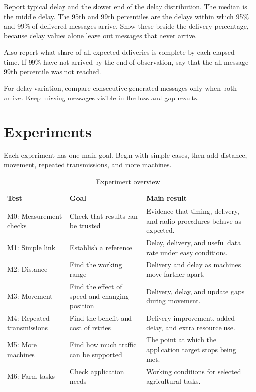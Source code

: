 \documentclass[11pt,a4paper]{article}
\begin{document}
Report typical delay and the slower end of the delay distribution. The median
is the middle delay. The 95th and 99th percentiles are the delays within which
95\% and 99\% of delivered messages arrive. Show these beside the delivery
percentage, because delay values alone leave out messages that never arrive.

Also report what share of all expected deliveries is complete by each elapsed
time. If 99\% have not arrived by the end of observation, say that the
all-message 99th percentile was not reached.

For delay variation, compare consecutive generated messages only when both
arrive. Keep missing messages visible in the loss and gap results.

\section{Experiments}
\label{sec:experiments}

Each experiment has one main goal. Begin with simple cases, then add distance,
movement, repeated transmissions, and more machines.

\begin{table}[htbp]
\centering
\caption{Experiment overview}
\small
\begin{tabularx}{\textwidth}{lYY}
\toprule
\textbf{Test} & \textbf{Goal} & \textbf{Main result} \\
\midrule
M0: Measurement checks & Check that results can be trusted &
Evidence that timing, delivery, and radio procedures behave as expected. \\
M1: Simple link & Establish a reference &
Delay, delivery, and useful data rate under easy conditions. \\
M2: Distance & Find the working range &
Delivery and delay as machines move farther apart. \\
M3: Movement & Find the effect of speed and changing position &
Delivery, delay, and update gaps during movement. \\
M4: Repeated transmissions & Find the benefit and cost of retries &
Delivery improvement, added delay, and extra resource use. \\
M5: More machines & Find how much traffic can be supported &
The point at which the application target stops being met. \\
M6: Farm tasks & Check application needs &
Working conditions for selected agricultural tasks. \\
\bottomrule
\end{tabularx}
\end{table}
\end{document}
